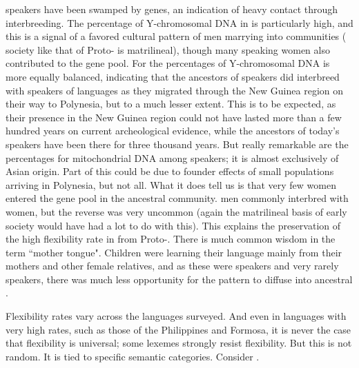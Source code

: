 \documentclass[output=paper]{langsci/langscibook}
\begin{document}
 speakers have been swamped by  genes, an indication of heavy contact through interbreeding. The percentage of  Y-chromosomal DNA in  is particularly high, and this is a signal of a favored cultural pattern of  men marrying into  communities ( society like that of Proto- is matrilineal), though many  speaking women also contributed to the  gene pool. For  the percentages of Y-chromosomal DNA is more equally balanced, indicating that the ancestors of  speakers did interbreed with speakers of  languages   as they migrated through the New Guinea region on their way to Polynesia, but to a much lesser extent. This is to be expected, as their presence in the New Guinea region could not have lasted more than a few hundred years on current archeological evidence, while the ancestors of today’s  speakers have been there for three thousand years. But really remarkable are the percentages for mitochondrial DNA among  speakers; it is almost exclusively of Asian origin. Part of this could be due to founder effects  of small populations arriving in Polynesia, but not all. What it does tell us is that very few  women entered the gene pool in the ancestral community.  men commonly interbred with  women, but the reverse was very uncommon (again the matrilineal basis of early  society would have had a lot to do with this). This explains the preservation of the high flexibility rate in  from Proto-. There is much common wisdom in the term ``mother tongue". Children were learning their language mainly from their mothers and other female relatives, and as these were  speakers and very rarely  speakers, there was much less opportunity for the  pattern to diffuse into ancestral .

 Flexibility rates vary across the  languages surveyed. And even in languages with very high rates, such as those of the Philippines and Formosa, it is never the case that flexibility is universal; some lexemes strongly resist flexibility. But this is not random. It is tied to specific semantic categories. Consider .
\end{document}
